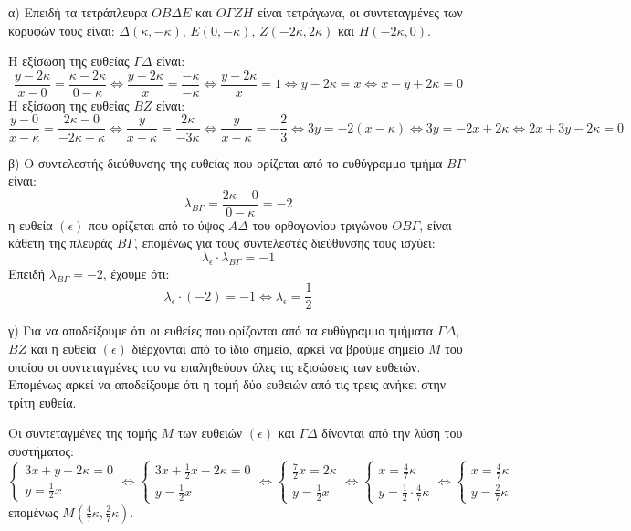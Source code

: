 α) Επειδή τα τετράπλευρα $OB\Delta E$ και $O\Gamma ZH$ είναι τετράγωνα, οι συντεταγμένες των κορυφών τους είναι: $\Delta(\kappa, -\kappa)$, $E(0, -\kappa)$, $Z(-2\kappa, 2\kappa)$ και $H(-2\kappa, 0)$.


Η εξίσωση της ευθείας $\Gamma\Delta$ είναι:
\[
\frac{y - 2\kappa}{x - 0} = \frac{\kappa - 2\kappa}{0 - \kappa} \iff \frac{y - 2\kappa}{x} = \frac{-\kappa}{-\kappa} \iff \frac{y - 2\kappa}{x} = 1 \iff y - 2\kappa = x \iff x - y + 2\kappa = 0
\]
Η εξίσωση της ευθείας $BZ$ είναι:
\[
\frac{y - 0}{x - \kappa} = \frac{2\kappa - 0}{-2\kappa - \kappa} \iff \frac{y}{x - \kappa} = \frac{2\kappa}{-3\kappa} \iff \frac{y}{x - \kappa} = -\frac{2}{3} \iff 3y = -2(x - \kappa) \iff 3y = -2x + 2\kappa \iff 2x + 3y - 2\kappa = 0
\]

β) Ο συντελεστής διεύθυνσης της ευθείας που ορίζεται από το ευθύγραμμο τμήμα $B\Gamma$ είναι:
\[
\lambda_{B\Gamma} = \frac{2\kappa - 0}{0 - \kappa} = -2
\]
η ευθεία $(\epsilon)$ που ορίζεται από το ύψος $A\Delta$ του ορθογωνίου τριγώνου $OB\Gamma$, είναι κάθετη της πλευράς $B\Gamma$, επομένως για τους συντελεστές διεύθυνσης τους ισχύει:
\[
\lambda_{\epsilon} \cdot \lambda_{B\Gamma} = -1
\]
Επειδή $\lambda_{B\Gamma} = -2$, έχουμε ότι:
\[
\lambda_{\epsilon} \cdot (-2) = -1 \iff \lambda_{\epsilon} = \frac{1}{2}
\]

γ) Για να αποδείξουμε ότι οι ευθείες που ορίζονται από τα ευθύγραμμο τμήματα $\Gamma\Delta$, $BZ$ και η ευθεία $(\epsilon)$ διέρχονται από το ίδιο σημείο, αρκεί να βρούμε σημείο $M$ του οποίου οι συντεταγμένες του να επαληθεύουν όλες τις εξισώσεις των ευθειών. Επομένως αρκεί να αποδείξουμε ότι η τομή δύο ευθειών από τις τρεις ανήκει στην τρίτη ευθεία.

Οι συντεταγμένες της τομής $M$ των ευθειών $(\epsilon)$ και $\Gamma\Delta$ δίνονται από την λύση του συστήματος:
\[
\begin{cases}
3x + y - 2\kappa = 0 \\
y = \frac{1}{2}x
\end{cases}
\iff
\begin{cases}
3x + \frac{1}{2}x - 2\kappa = 0 \\
y = \frac{1}{2}x
\end{cases}
\iff
\begin{cases}
\frac{7}{2}x = 2\kappa \\
y = \frac{1}{2}x
\end{cases}
\iff
\begin{cases}
x = \frac{4}{7}\kappa \\
y = \frac{1}{2} \cdot \frac{4}{7}\kappa
\end{cases}
\iff
\begin{cases}
x = \frac{4}{7}\kappa \\
y = \frac{2}{7}\kappa
\end{cases}
\]
επομένως $M\left(\frac{4}{7}\kappa, \frac{2}{7}\kappa\right)$.

